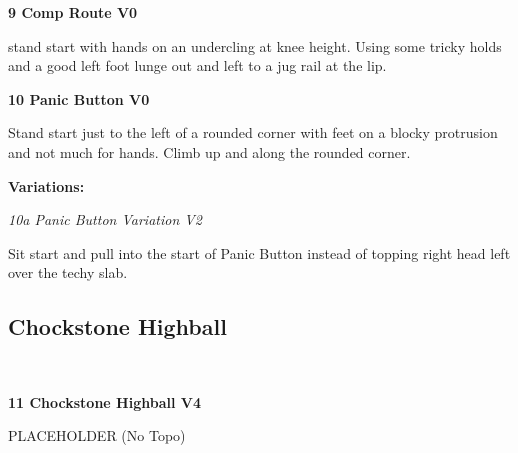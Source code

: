 \begin{multicols}{2}
					\begin{minipage}{\linewidth}	
					\label{rt:Comp Route}\colorbox{green!20}{\textbf{9 Comp Route V0   }}
					\begin{adjustwidth}{0.5cm}{}				
					stand start with hands on an undercling at knee height. Using some tricky holds and a good left foot lunge out and left to a jug rail at the lip.
					\end{adjustwidth}
					\end{minipage}
					\begin{minipage}{\linewidth}	
					\label{rt:Panic Button}\colorbox{green!20}{\textbf{10 Panic Button V0   }}
					\begin{adjustwidth}{0.5cm}{}				
					Stand start just to the left of a rounded corner with feet on a blocky protrusion and not much for hands. Climb up and along the rounded corner.
					\end{adjustwidth}
					\end{minipage}
						\begin{adjustwidth}{0.5cm}{}				
						\textbf{Variations:} \newline
							\begin{minipage}{\linewidth}	
							\label{vr:Panic Button Variation}\colorbox{green!20}{\emph{10a Panic Button Variation V2    }}
							\begin{adjustwidth}{0.5cm}{}				
							Sit start and pull into the start of Panic Button instead of topping right head left over the techy slab.
							\end{adjustwidth}
							\end{minipage}
						\end{adjustwidth}
			\subsection*{Chockstone Highball}\label{bf:Chockstone Highball}
			\begin{minipage}{\columnwidth}
			\
			\end{minipage}
			
					\begin{minipage}{\linewidth}	
					\label{rt:Chockstone Highball}\colorbox{RoyalBlue!20}{\textbf{11 Chockstone Highball V4  }}
					\begin{adjustwidth}{0.5cm}{}				
					PLACEHOLDER
						\newline (No Topo) 
					\end{adjustwidth}
					\end{minipage}
\end{multicols}

